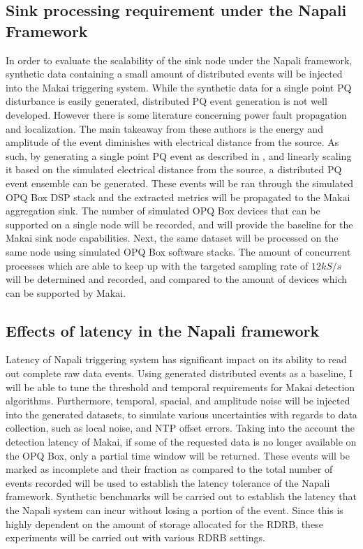 \subsection{Sink processing requirement under the Napali Framework} \label{iexp:sec:scale}
In order to evaluate the scalability of the sink node under the Napali framework, synthetic data containing a small amount of distributed events will be injected into the Makai triggering system. While the synthetic data for a single point PQ disturbance is easily generated, distributed PQ event generation is not well developed. However there is some literature concerning power fault propagation and localization. \cite{parsons1998direction} \cite{polajvzer2017evaluation} The main takeaway from these authors is the energy and amplitude of the event diminishes with electrical distance from the source. As such, by generating a single point PQ event as described in \cite{kumar2015power}\cite{tan2013simulation}, and linearly scaling it based on the simulated electrical distance from the source, a distributed PQ event ensemble can be generated. These events will be ran through the simulated OPQ Box DSP stack and the extracted metrics will be propagated to the Makai aggregation sink. The number of simulated OPQ Box devices that can be supported on a single node will be recorded, and will provide the baseline for the Makai sink node capabilities. Next, the same dataset will be processed on the same node using simulated OPQ Box software stacks. The amount of concurrent processes which are able to keep up with the targeted sampling rate of $12kS/s$ will be determined and recorded, and compared to the amount of devices which can be supported by Makai.

\subsection{Effects of latency in the Napali framework} \label{iexp:sec:lat}
Latency of Napali triggering system has significant impact on its ability to read out complete raw data events. Using generated distributed events as a baseline, I will be able to tune the threshold and temporal requirements for Makai detection algorithms. Furthermore, temporal, spacial, and amplitude noise will be injected into the generated datasets, to simulate various uncertainties with regards to data collection, such as local noise, and NTP offset errors. Taking into the account the detection latency of Makai, if some of the requested data is no longer available on the OPQ Box, only a partial time window will be returned. These events will be marked as incomplete and their fraction as compared to the total number of events recorded will be used to establish the latency tolerance of the Napali framework. 
Synthetic benchmarks will be carried out to establish the latency that the Napali system can incur without losing a portion of the event. Since this is highly dependent on the amount of storage allocated for the RDRB, these experiments will be carried out with various RDRB settings.

